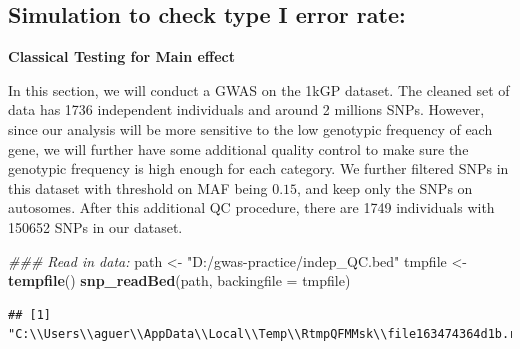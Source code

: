 \documentclass[
]{article}
\newenvironment{Shaded}{\begin{snugshade}}{\end{snugshade}}
\newcommand{\CommentTok}[1]{\textcolor[rgb]{0.56,0.35,0.01}{\textit{#1}}}
\newcommand{\DataTypeTok}[1]{\textcolor[rgb]{0.13,0.29,0.53}{#1}}
\newcommand{\DecValTok}[1]{\textcolor[rgb]{0.00,0.00,0.81}{#1}}
\newcommand{\KeywordTok}[1]{\textcolor[rgb]{0.13,0.29,0.53}{\textbf{#1}}}
\newcommand{\NormalTok}[1]{#1}
\newcommand{\OperatorTok}[1]{\textcolor[rgb]{0.81,0.36,0.00}{\textbf{#1}}}
\newcommand{\StringTok}[1]{\textcolor[rgb]{0.31,0.60,0.02}{#1}}
\begin{document}
\hypertarget{simulation-to-check-type-i-error-rate}{%
\subsection{Simulation to check type I error
rate:}\label{simulation-to-check-type-i-error-rate}}

\textbf{Classical Testing for Main effect}

In this section, we will conduct a GWAS on the 1kGP dataset. The cleaned
set of data has 1736 independent individuals and around 2 millions SNPs.
However, since our analysis will be more sensitive to the low genotypic
frequency of each gene, we will further have some additional quality
control to make sure the genotypic frequency is high enough for each
category. We further filtered SNPs in this dataset with threshold on MAF
being \(0.15\), and keep only the SNPs on autosomes. After this
additional QC procedure, there are 1749 individuals with 150652 SNPs in
our dataset.

\begin{Shaded}
\begin{Highlighting}[]
\CommentTok{### Read in data:}
\NormalTok{path <-}\StringTok{ "D:/gwas-practice/indep_QC.bed"}
\NormalTok{tmpfile  <-}\StringTok{ }\KeywordTok{tempfile}\NormalTok{()}
\KeywordTok{snp_readBed}\NormalTok{(path, }\DataTypeTok{backingfile =}\NormalTok{ tmpfile)}
\end{Highlighting}
\end{Shaded}

\begin{verbatim}
## [1] "C:\\Users\\aguer\\AppData\\Local\\Temp\\RtmpQFMMsk\\file163474364d1b.rds"
\end{verbatim}

\begin{Shaded}
\end{Shaded}
\end{document}
